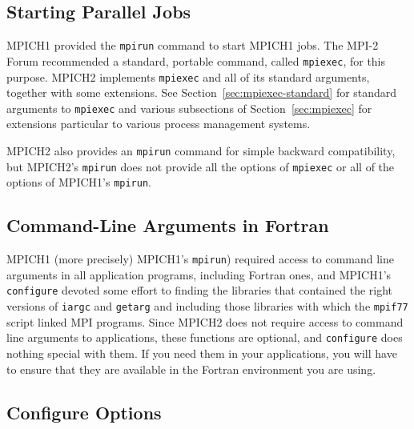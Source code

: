 \documentclass[dvipdfm,11pt]{article}
\begin{document}
\subsection{Starting Parallel Jobs}
\label{sec:startup}

MPICH1 provided the \texttt{mpirun} command to start MPICH1 jobs.  The
MPI-2 Forum recommended a standard, portable command, called
\texttt{mpiexec}, for this purpose.  MPICH2 implements \texttt{mpiexec}
and all of its standard arguments, together with some extensions.  See
Section~\ref{sec:mpiexec-standard} for standard arguments to
\texttt{mpiexec} and various subsections of Section~\ref{sec:mpiexec}
for extensions particular to various process management systems.

MPICH2 also provides an \texttt{mpirun} command for simple backward
compatibility, but MPICH2's \texttt{mpirun} does not provide all the
options of \texttt{mpiexec} or all of the options of MPICH1's
\texttt{mpirun}. 


\subsection{Command-Line Arguments in Fortran}
\label{sec:fortran-command-line}

MPICH1 (more precisely) MPICH1's \texttt{mpirun}) required access to
command line arguments in all application programs, including Fortran
ones, and MPICH1's \texttt{configure} devoted some effort to finding the
libraries that contained the right versions of \texttt{iargc} and
\texttt{getarg} and including those libraries with which the
\texttt{mpif77} script linked MPI programs.
Since MPICH2 does not require access to command line
arguments to applications, these functions are optional, and
\texttt{configure} does nothing special with them.  If you need them in
your applications, you will have to ensure that they are available in
the Fortran environment you are using.


\subsection{Configure Options}
\label{sec:configure-options}
\end{document}
